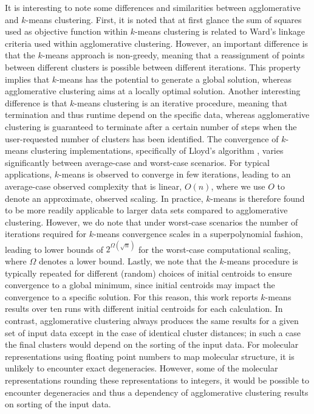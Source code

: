 It is interesting to note some differences and similarities between agglomerative and $k$-means clustering.
First, it is noted that at first glance the sum of squares used as objective function within $k$-means clustering is related to Ward's linkage criteria used within agglomerative clustering. 
However, an important difference is that the $k$-means approach is non-greedy, meaning that a reassignment of points between different clusters is possible between different iterations. 
This property implies that $k$-means has the potential to generate a global solution, whereas agglomerative clustering aims at a locally optimal solution.
Another interesting difference is that $k$-means clustering is an iterative procedure, meaning that termination and thus runtime depend on the specific data, whereas agglomerative clustering is guaranteed to terminate after a certain number of steps when the user-requested number of clusters has been identified. 
The convergence of $k$-means clustering implementations, specifically of Lloyd's algorithm \autocite{1056489}, varies significantly between average-case and worst-case scenarios.
For typical applications, $k$-means is observed to converge in few iterations, leading to an average-case observed complexity that is linear, $O(n)$, where we use $O$ to denote an approximate, observed scaling. 
In practice, $k$-means is therefore found to be more readily applicable to larger data sets compared to agglomerative clustering.
However, we do note that under worst-case scenarios the number of iterations required for $k$-means convergence scales in a superpolynomial fashion, leading to lower bounds of $2^{\Omega(\sqrt{n})}$ for the worst-case computational scaling, where $\Omega$ denotes a lower bound.\autocite{10.1145/1137856.1137880}
Lastly, we note that the $k$-means procedure is typically repeated for different (random) choices of initial centroids to ensure convergence to a global minimum, since initial centroids may impact the convergence to a specific solution.
For this reason, this work reports $k$-means results over ten runs with different initial centroids for each calculation.
In contrast, agglomerative clustering always produces the same results for a given set of input data except in the case of identical cluster distances; in such a case the final clusters would depend on the sorting of the input data.\autocite{yin_implementation-induced_2020}
For molecular representations using floating point numbers to map molecular structure, it is unlikely to encounter exact degeneracies. 
However, some of the molecular representations rounding these representations to integers, it would be possible to encounter degeneracies and thus a dependency of agglomerative clustering results on sorting of the input data. 


